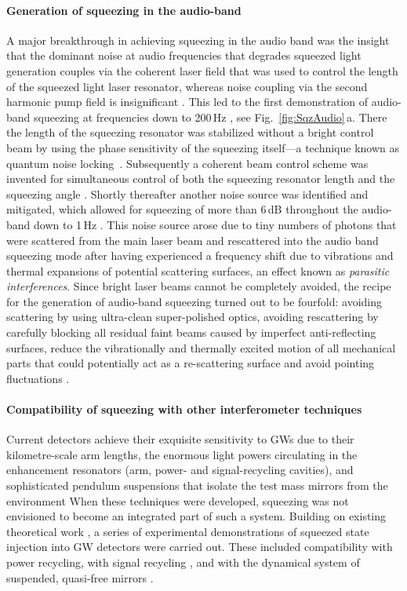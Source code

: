 \paragraph{Generation of squeezing in the audio-band}\; A major
breakthrough in achieving squeezing in the audio band was the
insight that the dominant noise at audio frequencies that
degrades squeezed light generation couples via the coherent laser
field that was used to control the length of the squeezed light
laser resonator, whereas noise coupling via the second harmonic
pump field is insignificant \cite{Bowen2002,Schnabel2004}. This led
to the first demonstration of audio-band squeezing at frequencies
down to 200\,Hz \cite{McKenzie2004}, see Fig.~\ref{fig:SqzAudio}\,a. There the length of the squeezing
resonator was stabilized without a bright control beam by using the phase sensitivity of the squeezing itself---a technique known as quantum noise locking~\cite{McKenzie2005}. Subsequently a coherent beam control scheme was invented \cite{Vahlbruch2006} for simultaneous control of both the squeezing resonator length and the squeezing angle \cite{GerryKnight}. Shortly thereafter another noise source was
identified and mitigated, which allowed for squeezing of more than
6\,dB throughout the audio-band down to 1\,Hz \cite{Vahlbruch2007}. This
noise source arose due to tiny numbers of photons that were
scattered from the main laser beam and rescattered into the audio
band squeezing mode after having experienced a frequency shift due
to vibrations and thermal expansions of potential scattering
surfaces, an effect known as \textit{parasitic interferences}. Since
bright laser beams cannot be completely avoided, the recipe for the
generation of audio-band squeezing turned out to be fourfold:
avoiding scattering by using ultra-clean super-polished optics,
avoiding rescattering by carefully blocking all residual faint beams
caused by imperfect anti-reflecting surfaces, reduce the
vibrationally and thermally excited motion of all mechanical parts
that could potentially act as a re-scattering surface and avoid pointing fluctuations \cite{McKenzie2007}.

\paragraph{Compatibility of squeezing with other interferometer techniques}\; Current detectors achieve their exquisite
sensitivity to GWs due to their kilometre-scale arm lengths, the
enormous light powers circulating in the enhancement resonators
(arm, power- and signal-recycling cavities),
and sophisticated pendulum suspensions that isolate the test mass
mirrors from the environment %
When these
techniques were developed, squeezing was not envisioned to become an
integrated part of such a system. Building on existing theoretical
work \cite{Gea-Banacloche1987,OpticalSpringHarms2003}, a series of experimental demonstrations
of squeezed state injection into GW detectors were carried out.
These included compatibility with power recycling, with signal
recycling \cite{McKenzie2002,Vahlbruch2005}, and with the dynamical system of
suspended, quasi-free mirrors \cite{Goda2008,Schnabel2008}.


